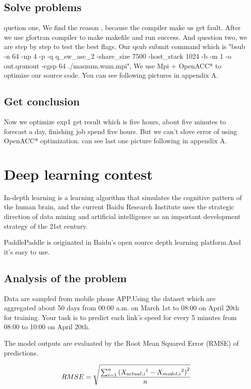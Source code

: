 \documentclass[conference,compsoc]{appendix/report}
\begin{document}
\subsection{Solve problems}
quetion one, We find the reason , because the compiler make us get fault. After we use gfortran compiler to make makefile and run success. And question two, we are step by step to test the best flags.  Our qsub submit command which is "bsub -n 64 -np 4 -p -q q\_sw\_asc\_2 -share\_size 7500 -host\_stack 1024 -b -m 1 -o out.qrunout -cgsp 64 ./masnum.wam.mpi", We use Mpi + OpenACC* to optimize our source code. You can see following pictures in appendix A.
\subsection{Get conclusion}
Now we optimize exp1 get result which is five hours, about five minutes to forecast a day, finishing job spend five hours. But we can't slove error of using OpenACC* optimization. can see last one picture following in appendix A.


\section{Deep learning contest}
In-depth learning is a learning algorithm that simulates the cognitive pattern of the human brain, and the current Baidu Research Institute uses the strategic direction of data mining and artificial intelligence as an important development strategy of the 21st century.

PaddlePaddle is originated in Baidu's open source depth learning platform.And it's easy to use.

\subsection{Analysis of the problem}
Data are sampled from mobile phone APP.Using the dataset which are aggregated about 50 days from 00:00 a.m. on March 1st to 08:00 on April 20th for training. Your task is to predict each link's speed for every 5 minutes from 08:00 to 10:00 on April 20th.

The model outputs are evaluated by the Root Mean Squared Error (RMSE) of
predictions.

$$RMSE = \sqrt{\frac{ \sum_{i=1}^{n} \left ({X}_{actual, i}\footnotemark [1] - {X}_{model, i}\footnotemark [2] \right )^{2}}{n} }$$
\end{document}
